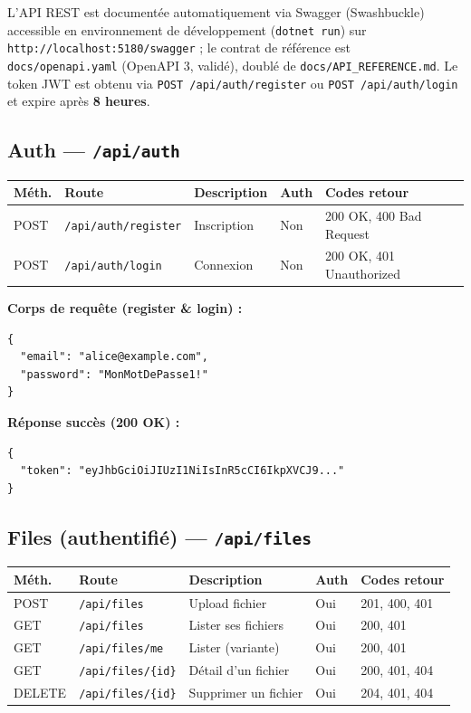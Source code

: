 \documentclass[12pt,a4paper]{article}
\begin{document}
L'API REST est document\'ee automatiquement via Swagger (Swashbuckle) accessible en environnement de d\'eveloppement (\texttt{dotnet run}) sur \texttt{http://localhost:5180/swagger} ; le contrat de r\'ef\'erence est \texttt{docs/openapi.yaml} (OpenAPI 3, valid\'e), doubl\'e de \texttt{docs/API\_REFERENCE.md}. Le token JWT est obtenu via \texttt{POST /api/auth/register} ou \texttt{POST /api/auth/login} et expire apr\`es \textbf{8 heures}.

\subsection{Auth --- \texttt{/api/auth}}

\begin{longtable}{p{1.2cm} p{3.5cm} p{3cm} p{1cm} p{5cm}}
\toprule
\textbf{M\'eth.} & \textbf{Route} & \textbf{Description} & \textbf{Auth} & \textbf{Codes retour} \\
\midrule
\endhead
POST & \texttt{/api/auth/register} & Inscription & Non & 200 OK, 400 Bad Request \\
POST & \texttt{/api/auth/login} & Connexion & Non & 200 OK, 401 Unauthorized \\
\bottomrule
\end{longtable}

\textbf{Corps de requ\^ete (register \& login) :}
\begin{lstlisting}
{
  "email": "alice@example.com",
  "password": "MonMotDePasse1!"
}
\end{lstlisting}

\textbf{R\'eponse succ\`es (200 OK) :}
\begin{lstlisting}
{
  "token": "eyJhbGciOiJIUzI1NiIsInR5cCI6IkpXVCJ9..."
}
\end{lstlisting}

\subsection{Files (authentifi\'e) --- \texttt{/api/files}}

\begin{longtable}{p{1.2cm} p{3.3cm} p{3.5cm} p{1cm} p{4.5cm}}
\toprule
\textbf{M\'eth.} & \textbf{Route} & \textbf{Description} & \textbf{Auth} & \textbf{Codes retour} \\
\midrule
\endhead
POST & \texttt{/api/files} & Upload fichier & Oui & 201, 400, 401 \\
GET & \texttt{/api/files} & Lister ses fichiers & Oui & 200, 401 \\
GET & \texttt{/api/files/me} & Lister (variante) & Oui & 200, 401 \\
GET & \texttt{/api/files/\{id\}} & D\'etail d'un fichier & Oui & 200, 401, 404 \\
DELETE & \texttt{/api/files/\{id\}} & Supprimer un fichier & Oui & 204, 401, 404 \\
\bottomrule
\end{longtable}
\end{document}

